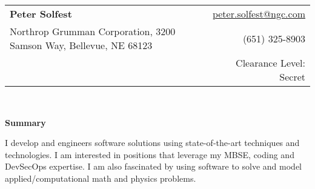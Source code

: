 \documentclass[letterpaper,11pt]{article}
\makeatletter
\newcommand{\resheading}[1]{{\large \textbf{#1}}}
\newcommand{\email}{\href{mailto:peter.solfest@ngc.com}{peter.solfest@ngc.com}}
\newcommand{\address}{{\footnotesize Northrop Grumman Corporation, 3200 Samson Way, Bellevue, NE 68123}}
\newcommand{\phone}{(651) 325-8903}
\makeatother
\begin{document}
\newcommand{\mywebheader}{
\begin{tabular*}{7in}{l@{\extracolsep{\fill}}r}
  \textbf{\LARGE Peter Solfest} & \email \\
    \address & \phone  \\
  & Clearance Level: Secret
\end{tabular*}
\\
\vspace{0.1in}}

\mywebheader

\resheading{Summary}

  I develop and engineers software solutions using  state-of-the-art techniques and technologies.
  I am interested in positions that leverage my MBSE, coding and DevSecOps expertise.
  I am also fascinated by using software to solve and model applied/computational math and physics problems.

  \vspace{0.1in}
\end{document}
